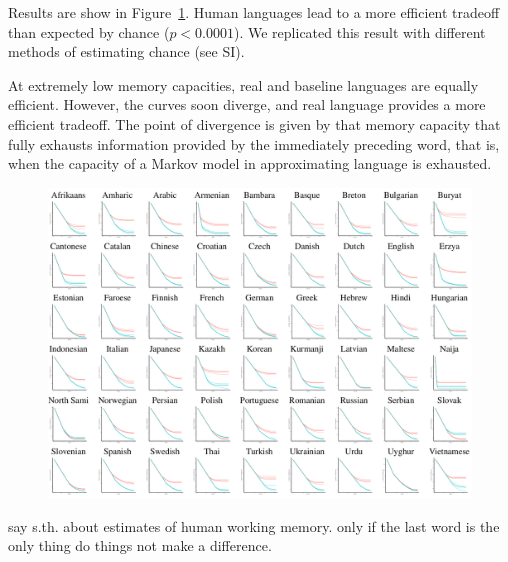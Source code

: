 \documentclass[11pt,letterpaper]{article}
\begin{document}
%


Results are show in Figure~\ref{fig:results}.
Human languages lead to a more efficient tradeoff than expected by chance ($p < 0.0001$).
We replicated this result with different methods of estimating chance (see SI).

At extremely low memory capacities, real and baseline languages are equally efficient.
However, the curves soon diverge, and real language provides a more efficient tradeoff.
The point of divergence is given by that memory capacity that fully exhausts information provided by the immediately preceding word, that is, when the capacity of a Markov model in approximating language is exhausted.


\begin{figure}
\includegraphics[width=\textwidth]{figures/full-results.png}
	\caption{}\label{fig:results}
\end{figure}


say s.th. about estimates of human working memory. only if the last word is the only thing do things not make a difference.
\end{document}
